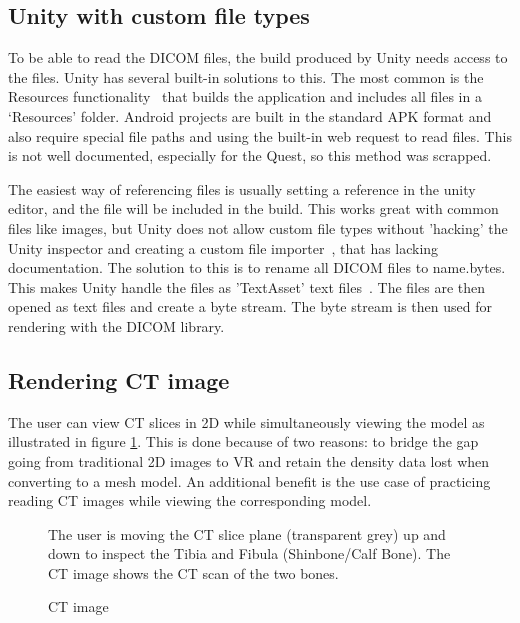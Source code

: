 \documentclass[a4paper]{report}
\begin{document}
\subsection{Unity with custom file types}

To be able to read the DICOM files, the build produced by Unity needs access to the files. Unity has several built-in solutions to this.
The most common is the Resources functionality~\cite{resourcesload_unity_nodate} that builds the application and includes all files in a `Resources' folder. Android projects are built in the standard APK format and also require special file paths and using the built-in web request to read files. This is not well documented, especially for the Quest, so this method was scrapped.

The easiest way of referencing files is usually setting a reference in the unity editor, and the file will be included in the build. This works great with common files like images, but Unity does not allow custom file types without 'hacking' the Unity inspector and creating a custom file importer~\cite{scriptedimporters_unity_nodate}, that has lacking documentation. The solution to this is to rename all DICOM files to {name}.bytes. This makes Unity handle the files as 'TextAsset' text files~\cite{textassets_unity_nodate}. The files are then opened as text files and create a byte stream. The byte stream is then used for rendering with the DICOM library.

\subsection{Rendering CT image}

The user can view CT slices in 2D while simultaneously viewing the model as illustrated in figure \ref{ctscan}. This is done because of two reasons: to bridge the gap going from traditional 2D images to VR and retain the density data lost when converting to a mesh model. An additional benefit is the use case of practicing reading CT images while viewing the corresponding model.

\begin{figure}[h!]
    \centering
	\hfill
	\caption{CT image}\label{ctscan}
  \small
 The user is moving the CT slice plane (transparent grey) up and down to inspect the Tibia and Fibula (Shinbone/Calf Bone). The CT image shows the CT scan of the two bones.
~~\cite{mishra_virtual_2019}
\end{figure}
\end{document}
